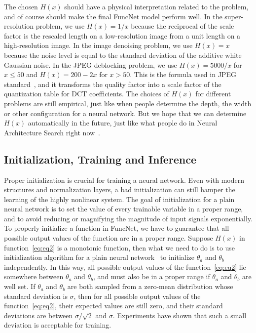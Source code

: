 \documentclass{article}
\begin{document}
The chosen $H(x)$ should have a physical interpretation related to the problem, and of course should make the final FuncNet model perform well. In the super-resolution problem, we use $H(x)=1/x$ because the reciprocal of the scale factor is the rescaled length on a low-resolution image from a unit length on a high-resolution image. In the image denoising problem, we use $H(x)=x$ because the noise level is equal to the standard deviation of the additive white Gaussian noise. In the JPEG deblocking problem, we use $H(x)=5000/x$ for $x\leq50$ and $H(x)=200-2x$ for $x>50$. This is the formula used in JPEG standard~\cite{pennebaker1992jpeg}, and it transforms the quality factor into a scale factor of the quantization table for DCT coefficients. The choices of $H(x)$ for different problems are still empirical, just like when people determine the depth, the width or other configuration for a neural network. But we hope that we can determine $H(x)$ automatically in the future, just like what people do in Neural Architecture Search right now~\cite{zoph2016neural}.

\subsection{Initialization, Training and Inference} \label{sec:infer}

Proper initialization is crucial for training a neural network. Even with modern structures and normalization layers, a bad initialization can still hamper the learning of the highly nonlinear system. The goal of initialization for a plain neural network is to set the value of every trainable variable in a proper range, and to avoid reducing or magnifying the magnitude of input signals exponentially. To properly initialize a function in FuncNet, we have to guarantee that all possible output values of the function are in a proper range. Suppose $H(x)$ in function~\ref{eq:eq2} is a monotonic function, then what we need to do is to use initialization algorithm for a plain neural network~\cite{he2015delving} to initialize $\theta_a$ and $\theta_b$ independently. In this way, all possible output values of the function~\ref{eq:eq2} lie somewhere between $\theta_a$ and $\theta_b$, and must also be in a proper range if $\theta_a$ and $\theta_b$ are well set. If $\theta_a$ and $\theta_b$ are both sampled from a zero-mean distribution whose standard deviation is $\sigma$, then for all possible output values of the function~\ref{eq:eq2}, their expected values are still zero, and their standard deviations are between $\sigma/\sqrt{2}$ and $\sigma$. Experiments have shown that such a small deviation is acceptable for training.
\end{document}

